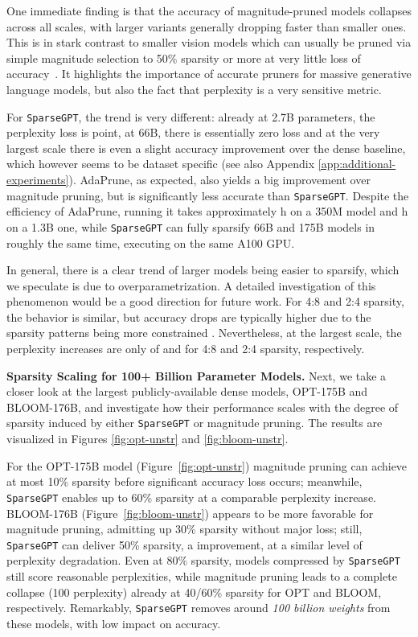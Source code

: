 \documentclass{article}
\theoremstyle{plain}
\theoremstyle{definition}
\theoremstyle{remark}
\renewcommand{\paragraph}[1]{\vspace{-0.1em} \noindent \textbf{#1}}
\newcommand{\sparsegpt}[1]{\texttt{SparseGPT}}
\begin{document}
One immediate finding is that the accuracy of magnitude-pruned models collapses across all scales, with larger variants generally dropping faster than smaller ones. This is in stark contrast to smaller vision models which can usually be pruned via simple magnitude selection to 50\% sparsity or more at very little loss of accuracy~\cite{singh2020woodfisher, frantar2022obc}. It highlights the importance of accurate pruners for massive generative language models, but also the fact that perplexity is a very sensitive metric. 

For \sparsegpt{}, the trend is very different: already at 2.7B parameters, the perplexity loss is  point, at 66B, there is essentially zero loss and at the very largest scale there is even a slight accuracy improvement over the dense baseline, which however seems to be dataset specific (see also Appendix \ref{app:additional-experiments}). AdaPrune, as expected, also yields a big improvement over magnitude pruning, but is significantly less accurate than \sparsegpt{}. Despite the efficiency of AdaPrune, running it takes approximately h on a 350M model and h on a 1.3B one, while \sparsegpt{} can fully sparsify 66B and 175B models in roughly the same time, executing on the same A100 GPU.

In general, there is a clear trend of larger models being easier to sparsify, which we speculate is due to overparametrization. 
A detailed investigation of this phenomenon would be a good direction for future work. 
For 4:8 and 2:4 sparsity, the behavior is similar, but accuracy drops are typically higher due to the sparsity patterns being more constrained \cite{hubara2021accelerated}. Nevertheless, at the largest scale, the perplexity increases are only of  and  for 4:8 and 2:4 sparsity, respectively.

\paragraph{Sparsity Scaling for 100+ Billion Parameter Models.} Next, we take a closer look at the largest publicly-available dense models, OPT-175B and BLOOM-176B, and investigate how their performance scales with the degree of sparsity induced by either \sparsegpt{} or magnitude pruning. The results are visualized in Figures \ref{fig:opt-unstr} and \ref{fig:bloom-unstr}.

For the OPT-175B model (Figure~\ref{fig:opt-unstr}) magnitude pruning can achieve at most 10\% sparsity before significant accuracy loss occurs; meanwhile, \sparsegpt{} enables up to 60\% sparsity at a comparable perplexity increase. BLOOM-176B (Figure~\ref{fig:bloom-unstr}) appears to be more favorable for magnitude pruning, admitting up 30\% sparsity without major loss; still, \sparsegpt{} can deliver 50\% sparsity, a  improvement, at a similar level of perplexity degradation. Even at 80\% sparsity, models compressed by \sparsegpt{} still score reasonable perplexities, while magnitude pruning leads to a complete collapse (100 perplexity) already at 40/60\% sparsity for OPT and BLOOM, respectively. Remarkably, \sparsegpt{} removes around \emph{100 billion weights} from these models, with low impact on accuracy.
\end{document}

